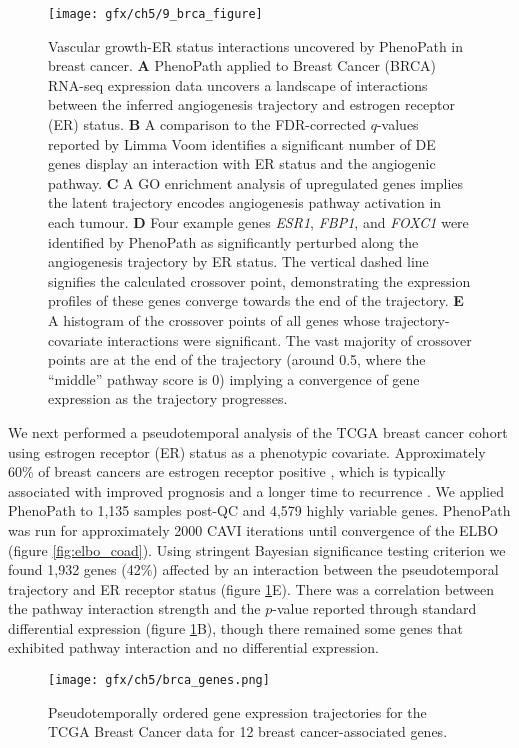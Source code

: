 \begin{figure}
\texttt{[image: gfx/ch5/9\_brca\_figure]}
\caption{Vascular growth-ER status interactions uncovered by PhenoPath in breast cancer.
\textbf{A} PhenoPath applied to Breast Cancer (BRCA) RNA-seq expression data uncovers a landscape of interactions between the inferred angiogenesis trajectory and estrogen receptor (ER) status.
\textbf{B} A comparison to the FDR-corrected $q$-values reported by Limma Voom identifies a significant number of DE genes display an interaction with ER status and the angiogenic pathway.
\textbf{C} A GO enrichment analysis of upregulated genes implies the latent trajectory encodes angiogenesis pathway activation in each tumour.
\textbf{D} Four example genes \emph{ESR1}, \emph{FBP1}, and \emph{FOXC1} were identified by PhenoPath as significantly perturbed along the angiogenesis trajectory by ER status. The vertical dashed line signifies the calculated crossover point, demonstrating the expression profiles of these genes converge towards the end of the trajectory.
\textbf{E} A histogram of the crossover points of all genes whose trajectory-covariate interactions were significant. The vast majority of crossover points are at the end of the trajectory (around 0.5, where the ``middle'' pathway score is 0) implying a convergence of gene expression as the trajectory progresses.
} \label{fig:brca}
\end{figure}


We next performed a pseudotemporal analysis of the TCGA breast cancer cohort using estrogen receptor (ER) status as a phenotypic covariate. Approximately 60\% of breast cancers are estrogen receptor positive
\cite{Early_Breast_Cancer_Trialists_Collaborative_Group_EBCTCG_undated-ux}, which is typically associated with improved prognosis and a longer time to recurrence 
\cite{Parl1984-fo}. We applied PhenoPath to 1,135 samples post-QC and 4,579 highly variable genes. PhenoPath was run for approximately 2000 CAVI iterations until convergence of the ELBO (figure \ref{fig:elbo_coad}). Using stringent Bayesian significance testing criterion we found 1,932 genes (42\%) affected by an interaction between the pseudotemporal trajectory and ER receptor status (figure \ref{fig:brca}E).
 There was a correlation between the pathway interaction strength and the $p$-value reported through standard differential expression (figure \ref{fig:brca}B), though there remained some genes that exhibited pathway interaction and no differential expression.

\begin{figure}
   \texttt{[image: gfx/ch5/brca\_genes.png]}
   \caption{Pseudotemporally ordered gene expression trajectories for the TCGA Breast Cancer data for 12 breast cancer-associated genes.}
	\label{fig:brca_genes}
\end{figure}

